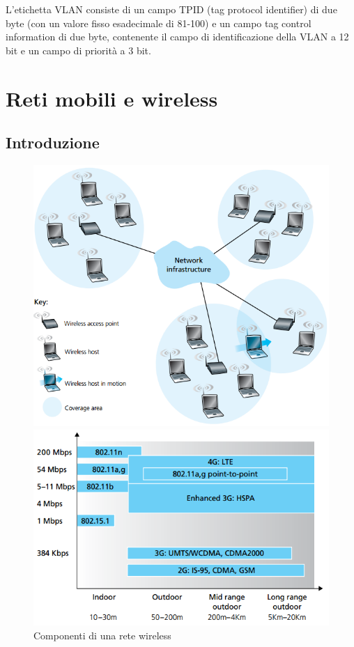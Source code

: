 \documentclass[11pt,a4paper]{article}
\begin{document}
{L'etichetta VLAN consiste di un campo TPID (tag protocol identifier) di due byte (con un valore fisso esadecimale di 81-100) e un campo tag control information di due byte, contenente il campo di identificazione della VLAN a 12 bit e un campo di priorità a 3 bit.

\section{Reti mobili e wireless}
\subsection{Introduzione}
\begin{figure}
	\includegraphics[scale=0.6]{img/091.png}
	\caption{Componenti di una rete wireless}
	\label{fig: 091}
	\includegraphics[scale=0.6]{img/092.png}

\end{figure}}
\end{document}
